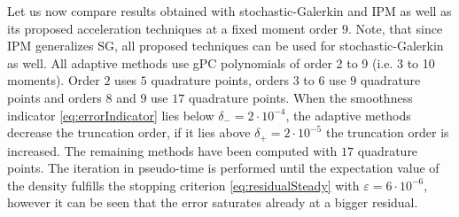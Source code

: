 Let us now compare results obtained with stochastic-Galerkin and IPM as well as its proposed acceleration techniques at a fixed moment order $9$. Note, that since IPM generalizes SG, all proposed techniques can be used for stochastic-Galerkin as well. All adaptive methods use gPC polynomials of order 2 to 9 (i.e. 3 to 10 moments). Order $2$ uses $5$ quadrature points, orders $3$ to $6$ use $9$ quadrature points and orders $8$ and $9$ use $17$ quadrature points. When the smoothness indicator \eqref{eq:errorIndicator} lies below $\delta_{-} = 2\cdot 10^{-4}$, the adaptive methods decrease the truncation order, if it lies above $\delta_{+} = 2\cdot 10^{-5}$ the truncation order is increased. The remaining methods have been computed with $17$ quadrature points. The iteration in pseudo-time is performed until the expectation value of the density fulfills the stopping criterion \eqref{eq:residualSteady} with $\varepsilon = 6\cdot 10^{-6}$, however it can be seen that the error saturates already at a bigger residual.


